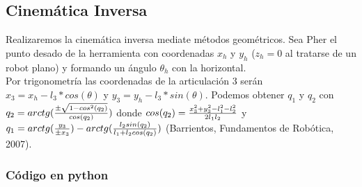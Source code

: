 \documentclass[twoside]{article}
\begin{document}
\begin{multicols}{2}

\subsection{Cinemática Inversa}
Realizaremos la cinemática inversa mediate métodos geométricos. Sea Pher el punto desado de la herramienta con coordenadas
$x_h$ y $y_h$ ($z_h=0$ al tratarse de un robot plano) y formando un ángulo $\theta_h$ con la horizontal. \\
Por trigonometría las coordenadas de la articulación 3 serán
\(x_3 = x_h - l_3 * cos(\theta)\) y \(y_3 = y_h - l_3 * sin(\theta)\).
Podemos obtener \(q_1\) y \(q_2\) con
\(q_2 = arctg({{\pm \sqrt{1-cos^2 (q_2)}} \over {cos (q_2)}})\) donde
\(cos (q_2) = {{x_3^2 + y_3^2 - l_1^2 - l_2^2} \over {2 l_1 l_2}}\) y
\(q_1 = arctg({{y_3}\over{\pm x_3}})-arctg({{l_2 sin(q_2)} \over {l_1 + l_2 cos(q_2)}})\)
(Barrientos, Fundamentos de Robótica, 2007).

\end{multicols}
\subsubsection{Código en python}
\end{document}
